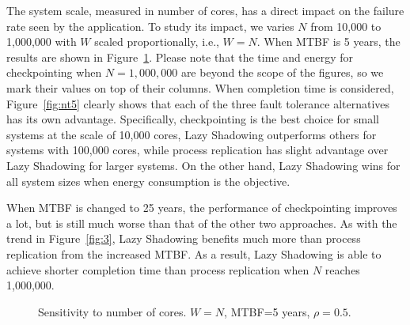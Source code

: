 The system scale, measured in number of cores, has a direct impact on the failure rate seen by the application. To study its impact, we varies $N$ from 10,000 to 1,000,000 with $W$ scaled proportionally, i.e., $W=N$. When MTBF is 5 years, the results are shown in Figure~\ref{fig:n5}. Please note that the time and energy for checkpointing when $N=1,000,000$ are beyond the scope of the figures, so we mark their values on top of their columns. When completion time is considered, Figure~\ref{fig:nt5} clearly shows that each of the three fault tolerance alternatives has its own advantage. Specifically, checkpointing is the best choice for small systems at the scale of 10,000 cores, Lazy Shadowing outperforms others for systems with 100,000 cores, while process replication has slight advantage over Lazy Shadowing for larger systems. On the other hand, Lazy Shadowing wins for all system sizes when energy consumption is the objective. 

When MTBF is changed to 25 years, the performance of checkpointing improves a lot, but is still much worse than that of the other two approaches. As with the trend in Figure~\ref{fig:3}, Lazy Shadowing benefits much more than process replication from the increased MTBF. As a result, Lazy Shadowing is able to achieve shorter completion time than process replication when $N$ reaches 1,000,000.

\begin{figure}[!t]
	\begin{center}
	\end{center}
	\caption{Sensitivity to number of cores. $W=N$, MTBF=5 years, $\rho=0.5$.}
	\label{fig:n5}
\end{figure}

